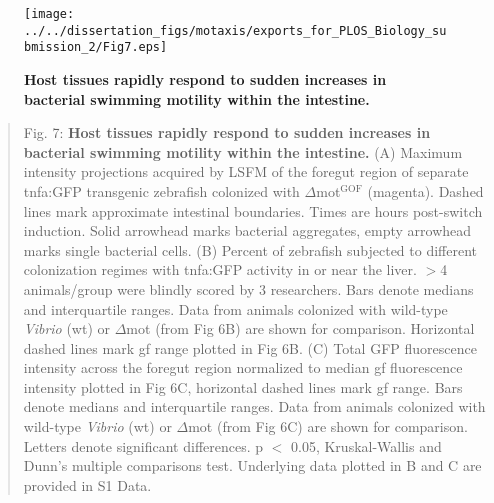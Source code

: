 \begin{figure}[h!]
	\centerline{
		\texttt{[image: ../../dissertation\_figs/motaxis/exports\_for\_PLOS\_Biology\_submission\_2/Fig7.eps]}}
	\caption{\textbf{Host tissues rapidly respond to sudden increases in bacterial swimming motility within the intestine.}}
\end{figure}

\begin{quote} 
Fig. 7: \textbf{Host tissues rapidly respond to sudden increases in bacterial swimming motility within the intestine.} (A) Maximum intensity projections acquired by LSFM of the foregut region of separate tnfa:GFP transgenic zebrafish colonized with $\Delta$mot$^{\text{GOF}}$ (magenta). Dashed lines mark approximate intestinal boundaries. Times are hours post-switch induction. Solid arrowhead marks bacterial aggregates, empty arrowhead marks single bacterial cells. (B) Percent of zebrafish subjected to different colonization regimes with tnfa:GFP activity in or near the liver. $ > $4 animals/group were blindly scored by 3 researchers. Bars denote medians and interquartile ranges. Data from animals colonized with wild-type \textit{Vibrio} (wt) or $\Delta$mot (from Fig 6B) are shown for comparison. Horizontal dashed lines mark gf range plotted in Fig 6B. (C) Total GFP fluorescence intensity across the foregut region normalized to median gf fluorescence intensity plotted in Fig 6C, horizontal dashed lines mark gf range. Bars denote medians and interquartile ranges. Data from animals colonized with wild-type \textit{Vibrio} (wt) or $\Delta$mot (from Fig 6C) are shown for comparison. Letters denote significant differences. p $ < $ 0.05, Kruskal-Wallis and Dunn's multiple comparisons test. Underlying data plotted in B and C are provided in S1 Data.
\end{quote}

